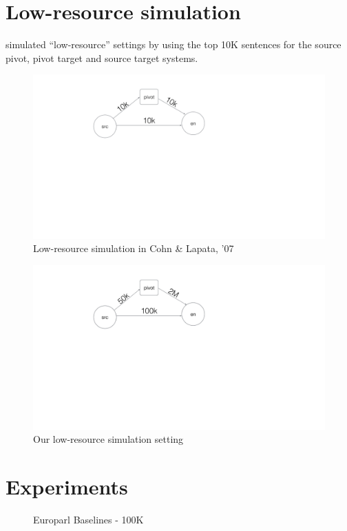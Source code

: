 \section{Low-resource simulation}

\cite{Cohn:07} simulated ``low-resource'' settings by using the top 10K sentences for the source pivot, pivot target and source target systems.  

\begin{figure}[ht]
	\small
	\centering
	\includegraphics[trim=2cm 4cm 4cm 4cm, height=0.6\textheight]{files/Figures/Cohn.jpg} 
	\caption{Low-resource simulation in Cohn \& Lapata, '07}
	\label{fig:Cohn_lowresource}
\end{figure}

\begin{figure}
	\small
	\centering
	\includegraphics[trim=2cm 4cm 4cm 4cm, height=0.5\textheight]{files/Figures/Our.jpg} 
	\caption{Our low-resource simulation setting}
	\label{fig:our_setting}
\end{figure}



\section{Experiments}
\begin{figure}[ht]
	\small
	\centering

	
	\label{table:eparlbaselines}
	\caption{Europarl Baselines - 100K}
\end{figure}

